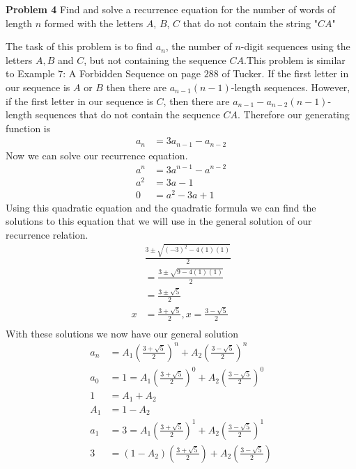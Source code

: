 \documentclass[12pt]{article}
\begin{document}
\noindent\textbf{Problem 4} Find and solve a recurrence equation for the number of words of length $n$ formed with the letters $A$, $B$, $C$ that do not contain the string "$CA$"\\
\begin{addmargin}[1em]{1em}
    The task of this problem is to find $a_n$, the number of $n$-digit sequences using the letters $A, B$ and $C$, but not containing the sequence $CA$.This problem is similar to Example $7$: A Forbidden Sequence on page $288$ of Tucker. If the first letter in our sequence is $A$ or $B$ then there are $a_{n-1}(n-1)$-length sequences. However, if the first letter in our sequence is $C$, then there are $a_{n-1}-a_{n-2}(n-1)$-length sequences that do not contain the sequence $CA$. Therefore our generating function is
    \begin{align*}
        a_n &= 3a_{n-1}-a_{n-2}
    \end{align*}
    Now we can solve our recurrence equation. 
    \begin{align*}
        a^n &=  3a^{n-1}-a^{n-2}\\
        a^2 &= 3a - 1\\
        0 &= a^2 -3a + 1
    \end{align*}
    Using this quadratic equation and the quadratic formula we can find the solutions to this equation that we will use in the general solution of our recurrence relation.
    \begin{align*}
        &\frac{3 \pm \sqrt{(-3)^2-4(1)(1)}}{2}\\
        &=\frac{3 \pm \sqrt{9-4(1)(1)}}{2}\\
        &=\frac{3 \pm \sqrt{5}}{2}\\
        x &= \frac{3 + \sqrt{5}}{2}, x = \frac{3 - \sqrt{5}}{2}\\
    \end{align*}
    With these solutions we now have our general solution
    \begin{align*}
        a_n &= A_1(\frac{3 + \sqrt{5}}{2})^n + A_2(\frac{3 - \sqrt{5}}{2})^n\\
        a_0 &= 1 = A_1(\frac{3 + \sqrt{5}}{2})^0 + A_2(\frac{3 - \sqrt{5}}{2})^0\\
        1 &= A_1 + A_2\\
        A_1 &= 1 - A_2\\
        a_1 &= 3 = A_1(\frac{3 + \sqrt{5}}{2})^1 + A_2(\frac{3 - \sqrt{5}}{2})^1\\
        3 &= (1- A_2)(\frac{3 + \sqrt{5}}{2}) + A_2(\frac{3 - \sqrt{5}}{2})\\

\end{align*}
\end{addmargin}
\end{document}

